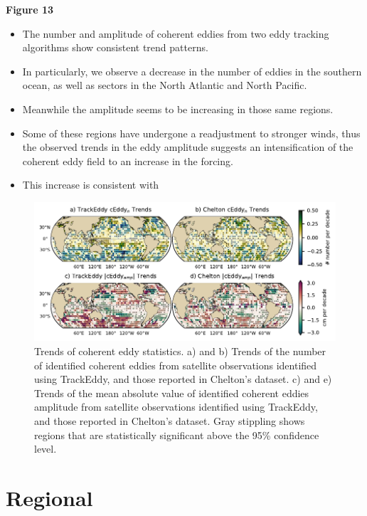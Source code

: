 \documentclass[draft,linenumbers]{agujournal2019}
\begin{document}
	\textbf{Figure 13}
	\begin{itemize}
		\item The number and amplitude of coherent eddies from two eddy tracking algorithms show consistent trend patterns. 
		\item In particularly, we observe a decrease in the number of eddies in the southern ocean, as well as sectors in the North Atlantic and North Pacific. 
		\item Meanwhile the amplitude seems to be increasing in those same regions. 
		\item Some of these regions have undergone a readjustment to stronger winds, thus the observed trends in the eddy amplitude suggests an intensification of the coherent eddy field to an increase in the forcing.
		\item This increase is consistent with \citet{Martinez_Kinetic_2021}
	\end{itemize}

	\begin{figure}
	    \centering
	    \includegraphics[width=1\textwidth]{figures/all_trackeddy_trends.pdf}
	    \caption{Trends of coherent eddy statistics. a) and b) Trends of the number of identified coherent eddies from satellite observations identified using TrackEddy, and those reported in Chelton's dataset. c) and e) Trends of the mean absolute value of identified coherent eddies amplitude from satellite observations identified using TrackEddy, and those reported in Chelton's dataset. Gray stippling shows regions that are statistically significant above the 95\% confidence level.
		}
	    \label{fig:eddy_stats_trends}
	\end{figure}


	\section{Regional}
\end{document}
